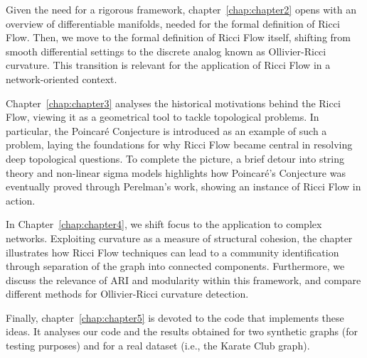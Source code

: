 Given the need for a rigorous framework, chapter~\ref{chap:chapter2} opens with an overview of differentiable manifolds, needed for the formal definition of Ricci Flow. Then, we move to the formal definition of Ricci Flow itself, shifting from smooth differential settings to the discrete analog known as Ollivier-Ricci curvature. This transition is relevant for the application of Ricci Flow in a network-oriented context. 

Chapter~\ref{chap:chapter3} analyses the historical motivations behind the Ricci Flow, viewing it as a geometrical tool to tackle topological problems. In particular, the Poincaré Conjecture is introduced as an example of such a problem, laying the foundations for why Ricci Flow became central in resolving deep topological questions. To complete the picture, a brief detour into string theory and non-linear sigma models highlights how Poincaré's Conjecture was eventually proved through Perelman's work, showing an instance of Ricci Flow in action.

In Chapter~\ref{chap:chapter4}, we shift focus to the application to complex networks. Exploiting curvature as a measure of structural cohesion, the chapter illustrates how Ricci Flow techniques can lead to a community identification through separation of the graph into connected components. Furthermore, we discuss the relevance of ARI and modularity within this framework, and compare different methods for Ollivier-Ricci curvature detection.

Finally, chapter~\ref{chap:chapter5} is devoted to the code that implements these ideas. It analyses our code and the results obtained for two synthetic graphs (for testing purposes) and for a real dataset (i.e., the Karate Club graph).

